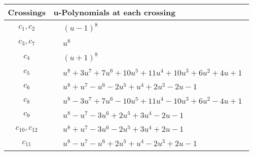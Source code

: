 \documentclass[1p]{elsarticle_modified}
\theoremstyle{definition}
\begin{document}
\begin{tabular}{m{50pt}|m{274pt}}
Crossings & \hspace{64pt}u-Polynomials at each crossing \\
\hline $$\begin{aligned}c_{1},c_{2}\end{aligned}$$&$\begin{aligned}
&(u-1)^8
\end{aligned}$\\
\hline $$\begin{aligned}c_{3},c_{7}\end{aligned}$$&$\begin{aligned}
&u^8
\end{aligned}$\\
\hline $$\begin{aligned}c_{4}\end{aligned}$$&$\begin{aligned}
&(u+1)^8
\end{aligned}$\\
\hline $$\begin{aligned}c_{5}\end{aligned}$$&$\begin{aligned}
&u^8+3 u^7+7 u^6+10 u^5+11 u^4+10 u^3+6 u^2+4 u+1
\end{aligned}$\\
\hline $$\begin{aligned}c_{6}\end{aligned}$$&$\begin{aligned}
&u^8+u^7- u^6-2 u^5+u^4+2 u^3-2 u-1
\end{aligned}$\\
\hline $$\begin{aligned}c_{8}\end{aligned}$$&$\begin{aligned}
&u^8-3 u^7+7 u^6-10 u^5+11 u^4-10 u^3+6 u^2-4 u+1
\end{aligned}$\\
\hline $$\begin{aligned}c_{9}\end{aligned}$$&$\begin{aligned}
&u^8- u^7-3 u^6+2 u^5+3 u^4-2 u-1
\end{aligned}$\\
\hline $$\begin{aligned}c_{10},c_{12}\end{aligned}$$&$\begin{aligned}
&u^8+u^7-3 u^6-2 u^5+3 u^4+2 u-1
\end{aligned}$\\
\hline $$\begin{aligned}c_{11}\end{aligned}$$&$\begin{aligned}
&u^8- u^7- u^6+2 u^5+u^4-2 u^3+2 u-1
\end{aligned}$\\
\hline
\end{tabular}\\~\\
\end{document}
